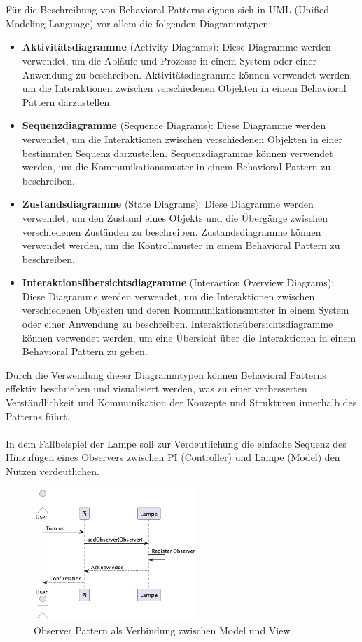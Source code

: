 \documentclass[../vs-script-first-v01.tex]{subfiles}
\begin{document}
\\\\
Für die Beschreibung von Behavioral Patterns eignen sich in UML (Unified Modeling Language) vor allem die folgenden Diagrammtypen:
\begin{itemize}
\item \textbf{Aktivitätsdiagramme} (Activity Diagrams): Diese Diagramme werden verwendet, um die Abläufe und Prozesse in einem System oder einer Anwendung zu beschreiben. Aktivitätsdiagramme können verwendet werden, um die Interaktionen zwischen verschiedenen Objekten in einem Behavioral Pattern darzustellen.
\item \textbf{Sequenzdiagramme} (Sequence Diagrams): Diese Diagramme werden verwendet, um die Interaktionen zwischen verschiedenen Objekten in einer bestimmten Sequenz darzustellen. Sequenzdiagramme können verwendet werden, um die Kommunikationsmuster in einem Behavioral Pattern zu beschreiben.
\item \textbf{Zustandsdiagramme} (State Diagrams): Diese Diagramme werden verwendet, um den Zustand eines Objekts und die Übergänge zwischen verschiedenen Zuständen zu beschreiben. Zustandsdiagramme können verwendet werden, um die Kontrollmuster in einem Behavioral Pattern zu beschreiben.
\item \textbf{Interaktionsübersichtsdiagramme} (Interaction Overview Diagrams): Diese Diagramme werden verwendet, um die Interaktionen zwischen verschiedenen Objekten und deren Kommunikationsmuster in einem System oder einer Anwendung zu beschreiben. Interaktionsübersichtsdiagramme können verwendet werden, um eine Übersicht über die Interaktionen in einem Behavioral Pattern zu geben.
\end{itemize}
Durch die Verwendung dieser Diagrammtypen können Behavioral Patterns effektiv beschrieben und visualisiert werden, was zu einer verbesserten Verständlichkeit und Kommunikation der Konzepte und Strukturen innerhalb des Patterns führt.
\\\\
In dem Fallbeispiel der Lampe soll zur Verdeutlichung die einfache Sequenz des Hinzufügen eines Observers zwischen PI (Controller) und Lampe (Model) den Nutzen verdeutlichen. 

\begin{figure}[ht]
  \centering
  \includegraphics[width=0.55\textwidth]{fig/uml/seq-mvc-observer.png}
  \caption{Observer Pattern als Verbindung zwischen Model und View}
  \label{fig:seq-mvc-observer}
\end{figure}
\end{document}
